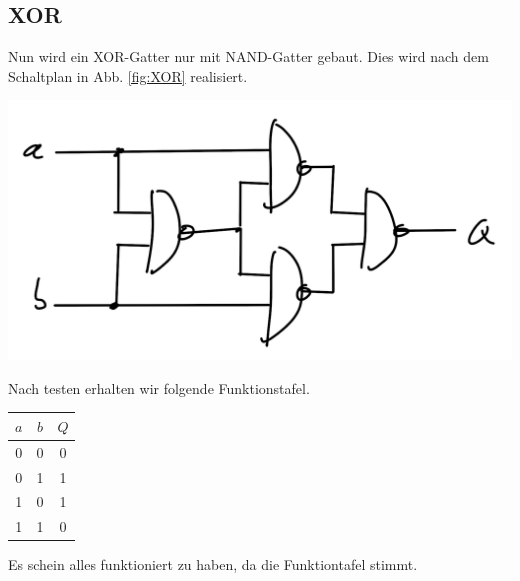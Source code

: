 \documentclass[10pt]{article}
\newenvironment{Figure}
  {\par\medskip\noindent\minipage{\linewidth}}
  {\endminipage\par\medskip}
\begin{document}
\begin{multicols}{2}
	\subsection{XOR}
	Nun wird ein XOR-Gatter nur mit NAND-Gatter gebaut. Dies wird nach dem Schaltplan in Abb. \ref{fig:XOR} realisiert.
	\begin{Figure}
		\centering\includegraphics[width=1\textwidth]{XOR.png}
		\label{fig:XOR}
	\end{Figure}
	Nach testen erhalten wir folgende Funktionstafel.
	\begin{center}
		\begin{tabular}{|c|c|c|}
			\hline
			$a$ & $b$ & $Q$ \\
			\hline
			0   & 0   & 0   \\
			0   & 1   & 1   \\
			1   & 0   & 1   \\
			1   & 1   & 0   \\
			\hline
		\end{tabular}
	\end{center}
	Es schein alles funktioniert zu haben, da die Funktiontafel stimmt.


\end{multicols}
\end{document}
